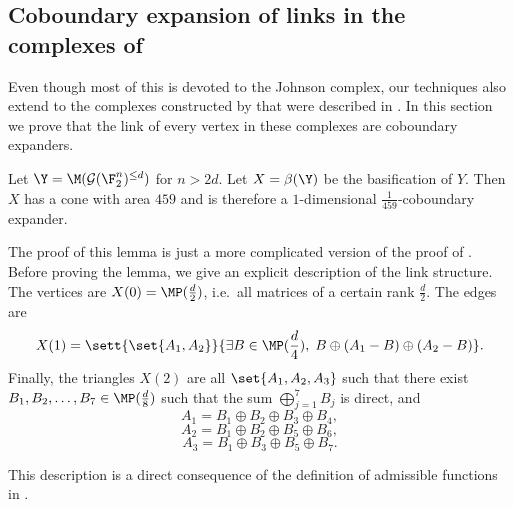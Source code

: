 \subsection[Coboundary expansion of links in the complexes of Golowich]{Coboundary expansion of links in the complexes of \cite{Golowich2023}}
\label{sec:coboundary-Golowich}
Even though most of this  is devoted to the Johnson complex, our techniques also extend to the complexes constructed by \cite{Golowich2023} that were described in . In this section we prove that the link of every vertex in these complexes are coboundary expanders.
\begin{lemma} \label{lem:louis-coboundary-expander}
    Let \(\Y=\M(\mathcal{G}(\F_2^n)^{\leq d})\) for \(n > 2d\). Let \(X = \beta(\Y)\) be the basification of \(Y\). Then \(X\) has a cone with area \(459\) and is therefore a $1$-dimensional \(\frac{1}{459}\)-coboundary expander.
\end{lemma}

The proof of this lemma is just a  more complicated version of the proof of . 
%
Before proving the lemma, we give an explicit description of the link structure. The vertices are \(X(0) = \MP(\frac{d}{2})\), i.e.\ all matrices of a certain rank \(\frac{d}{2}\). The edges are
\[X(1) = \sett{\set{A_1,A_2}}{\exists B \in \MP(\frac{d}{4}), \; B \oplus (A_1-B) \oplus (A_2-B)}.\]
Finally, the triangles \(X(2)\) are all \(\set{A_1,A_2,A_3}\) such that there exist \(B_1,B_2,\dots,B_7 \in \MP(\frac{d}{8})\) such that the sum \(\bigoplus_{j=1}^7 B_j\) is direct, and
\[A_1 = B_1\oplus B_2 \oplus B_3 \oplus B_4,\]
\[A_2 = B_1\oplus B_2 \oplus B_5 \oplus B_6,\]
\[A_3 = B_1\oplus B_3 \oplus B_5 \oplus B_7.\]

This description is a direct consequence of the definition of admissible functions in .

